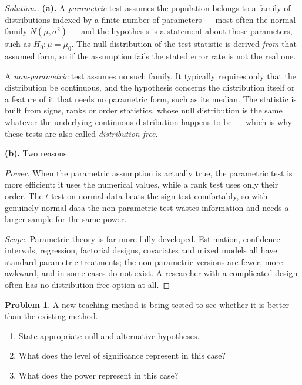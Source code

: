 \documentclass[11pt,a4paper]{article}
\theoremstyle{definition}
\newtheorem{problemx}{Problem}[section]
\newenvironment{problem}{\begin{problemx}}{\end{problemx}}
\newenvironment{solution}
  {\renewcommand{\qedsymbol}{}\begin{proof}[\textit{Solution}.]}
  {\end{proof}}
\begin{document}
\begin{solution}
\textbf{(a).} A \emph{parametric} test assumes the population belongs to a family
of distributions indexed by a finite number of parameters --- most often the
normal family $N\left(\mu,\sigma^{2}\right)$ --- and the hypothesis is a statement
about those parameters, such as $H_0:\mu=\mu_0$. The null distribution of the test
statistic is derived \emph{from} that assumed form, so if the assumption fails the
stated error rate is not the real one.

A \emph{non-parametric} test assumes no such family. It typically requires only
that the distribution be continuous, and the hypothesis concerns the distribution
itself or a feature of it that needs no parametric form, such as its median. The
statistic is built from signs, ranks or order statistics, whose null distribution
is the same whatever the underlying continuous distribution happens to be --- which
is why these tests are also called \emph{distribution-free}.

\textbf{(b).} Two reasons.

\emph{Power.} When the parametric assumption is actually true, the parametric test
is more efficient: it uses the numerical values, while a rank test uses only their
order. The $t$-test on normal data beats the sign test comfortably, so with
genuinely normal data the non-parametric test wastes information and needs a
larger sample for the same power.

\emph{Scope.} Parametric theory is far more fully developed. Estimation,
confidence intervals, regression, factorial designs, covariates and mixed models
all have standard parametric treatments; the non-parametric versions are fewer,
more awkward, and in some cases do not exist. A researcher with a complicated
design often has no distribution-free option at all.
\end{solution}

\begin{problem}
A new teaching method is being tested to see whether it is better than the existing
method.
\begin{enumerate}
\item[(a).] State appropriate null and alternative hypotheses.
\item[(b).] What does the level of significance represent in this case?
\item[(c).] What does the power represent in this case?
\end{enumerate}
\end{problem}
\end{document}
